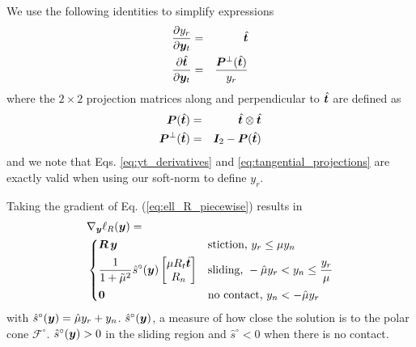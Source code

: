 We use the following identities to simplify expressions
\begin{eqnarray}
	\frac{\partial y_r}{\partial\vf{y}_t} &=& \hat{\vf{t}}\nonumber\\
	\frac{\partial \hat{\vf{t}}}{\partial\vf{y}_t} &=&
	\frac{\vf{P}^\perp(\hat{\vf{t}})}{y_r}
	\label{eq:yt_derivatives}
\end{eqnarray}
where the $2\times 2$ projection matrices along and perpendicular to
$\hat{{\bm{t}}}$ are defined as
\begin{eqnarray}
	\vf{P}(\hat{\vf{t}}) &=& \hat{\vf{t}}\otimes\hat{\vf{t}}\nonumber\\
	\vf{P}^\perp(\hat{\vf{t}})&=&\vf{I}_2 - \vf{P}(\hat{\vf{t}})
	\label{eq:tangential_projections}
\end{eqnarray}
and we note that Eqs. \eqref{eq:yt_derivatives} and
\eqref{eq:tangential_projections} are exactly valid when using our soft-norm to
define $y_r$.

Taking the gradient of Eq. (\ref{eq:ell_R_piecewise}) results in
\begin{align}
	&\nabla_\vf{y}\ell_R(\vf{y}) = 
	\label{eq:gradient_ell_R_piecewise}\\
&\begin{dcases}
	\vf{R}\,\vf{y} & 
	\text{stiction, } y_r \le \mu y_n\\
	\frac{1}{1+\tilde\mu^2}\hat{s}^\circ(\vf{y})\begin{bmatrix}
		\mu R_t\hat{\vf{t}}\\
		R_n\\
	\end{bmatrix} &
	\text{sliding, } -\hat\mu y_r < y_n \leq \frac{y_r}{\mu}\\
    \vf{0} & \text{no contact, } y_n < -\hat\mu y_r
\end{dcases}\nonumber
\end{align}
with $\hat{s}^\circ({\bm{y}}) = \hat{\mu}y_r+y_n$. $\hat{s}^\circ({\bm{y}})$, a
measure of how close the solution is to the polar cone $\mathcal{F}^\circ$.
$\hat{s}^\circ({\bm{y}}) > 0$ in the sliding region and $\hat{s}^\circ<0$ when
there is no contact.

